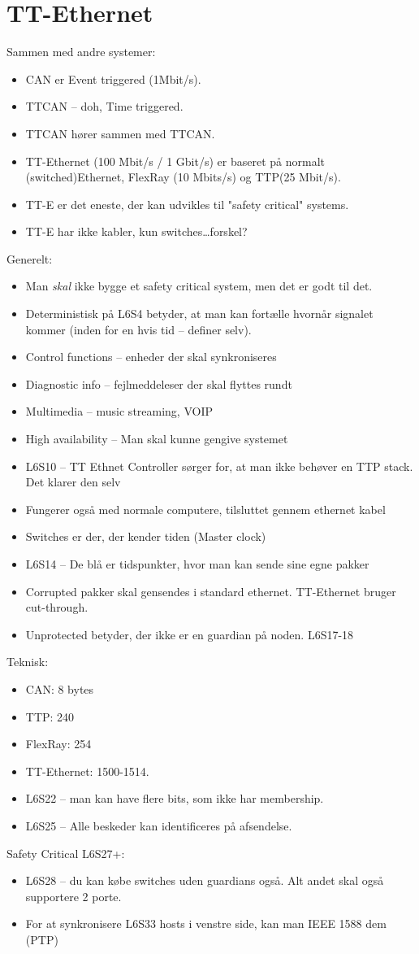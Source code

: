 \documentclass[oneside, 10pt]{article}
\begin{document}
\newpage
\section{TT-Ethernet}

Sammen med andre systemer:
\begin{itemize}
	\item CAN er Event triggered (1Mbit/s).
	\item TTCAN -- doh, Time triggered. 
	\item TTCAN hører sammen med TTCAN.
	\item TT-Ethernet (100 Mbit/s / 1 Gbit/s) er baseret på normalt (switched)Ethernet, FlexRay (10 Mbits/s) og TTP(25 Mbit/s).
	\item TT-E er det eneste, der kan udvikles til "safety critical" systems.
	\item TT-E har ikke kabler, kun switches\dots forskel?
\end{itemize}

Generelt:
\begin{itemize}
	\item Man \emph{skal} ikke bygge et safety critical system, men det er godt til det.
	\item Deterministisk på L6S4 betyder, at man kan fortælle hvornår signalet kommer (inden for en hvis tid -- definer selv).
	\item Control functions -- enheder der skal synkroniseres
	\item Diagnostic info -- fejlmeddeleser der skal flyttes rundt
	\item Multimedia -- music streaming, VOIP
	\item High availability -- Man skal kunne gengive systemet
	\item L6S10 -- TT Ethnet Controller sørger for, at man ikke behøver en TTP stack. Det klarer den selv
	\item Fungerer også med normale computere, tilsluttet gennem ethernet kabel
	\item Switches er der, der kender tiden (Master clock)
	\item L6S14 -- De blå er tidspunkter, hvor man kan sende sine egne pakker
	\item Corrupted pakker skal gensendes i standard ethernet. TT-Ethernet bruger cut-through.
	\item Unprotected betyder, der ikke er en guardian på noden. L6S17-18
\end{itemize}

Teknisk:
\begin{itemize}
	\item CAN: 8 bytes
	\item[] TTP: 240
	\item[] FlexRay: 254
	\item[] TT-Ethernet: 1500-1514.
	\item L6S22 -- man kan have flere bits, som ikke har membership.
	\item L6S25 -- Alle beskeder kan identificeres på afsendelse.
\end{itemize}

Safety Critical L6S27+:
\begin{itemize}
	\item L6S28 -- du kan købe switches uden guardians også. Alt andet skal også supportere 2 porte.
	\item For at synkronisere L6S33 hosts i venstre side, kan man IEEE 1588 dem (PTP)
\end{itemize}
\end{document}
